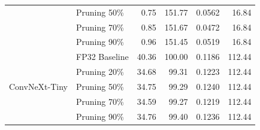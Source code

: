 \begin{table}[htbp]
{\begin{tabular}{llrrrr}
  & Pruning 50\% & 0.75 & 151.77 & 0.0562 & 16.84 \\
  & Pruning 70\% & 0.85 & 151.67 & 0.0472 & 16.84 \\
  & Pruning 90\% & 0.96 & 151.45 & 0.0519 & 16.84 \\
\midrule
\multirow{5}{*}{ConvNeXt-Tiny}
  & FP32 Baseline & 40.36 & 100.00 & 0.1186 & 112.44 \\
  & Pruning 20\% & 34.68 & 99.31 & 0.1223 & 112.44 \\
  & Pruning 50\% & 34.75 & 99.29 & 0.1240 & 112.44 \\
  & Pruning 70\% & 34.59 & 99.27 & 0.1219 & 112.44 \\
  & Pruning 90\% & 34.76 & 99.40 & 0.1236 & 112.44 \\
\bottomrule
\end{tabular}%
}
\end{table}